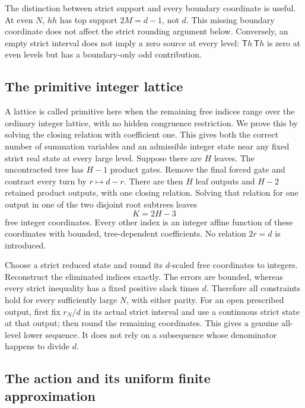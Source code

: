 \documentclass[11pt]{article}
\numberwithin{equation}{section}
\theoremstyle{definition}\newtheorem{definition}[theorem]{Definition}
\theoremstyle{remark}\newtheorem{remark}[theorem]{Remark}
\newcommand{\Turn}{\mathsf T}\newcommand{\Cheb}{\mathsf C}
\begin{document}
The distinction between strict support and every boundary coordinate is useful. At even $N$, $hh$ has top support $2M=d-1$, not $d$. This missing boundary coordinate does not affect the strict rounding argument below. Conversely, an empty strict interval does not imply a zero source at every level: $\Turn h\,\Turn h$ is zero at even levels but has a boundary-only odd contribution.

\subsection{The primitive integer lattice}

A lattice is called primitive here when the remaining free indices range over the ordinary integer lattice, with no hidden congruence restriction. We prove this by solving the closing relation with coefficient one. This gives both the correct number of summation variables and an admissible integer state near any fixed strict real state at every large level.
Suppose there are $H$ leaves. The uncontracted tree has $H-1$ product gates. Remove the final forced gate and contract every turn by $r\mapsto d-r$. There are then $H$ leaf outputs and $H-2$ retained product outputs, with one closing relation. Solving that relation for one output in one of the two disjoint root subtrees leaves
\begin{equation}\label{eq:lattice-dimension}
 K=2H-3
\end{equation}
free integer coordinates. Every other index is an integer affine function of these coordinates with bounded, tree-dependent coefficients. No relation $2r=d$ is introduced.

Choose a strict reduced state and round its $d$-scaled free coordinates to integers. Reconstruct the eliminated indices exactly. The errors are bounded, whereas every strict inequality has a fixed positive slack times $d$. Therefore all constraints hold for every sufficiently large $N$, with either parity. For an open prescribed output, first fix $r_N/d$ in its actual strict interval and use a continuous strict state at that output; then round the remaining coordinates. This gives a genuine all-level lower sequence. It does not rely on a subsequence whose denominator happens to divide $d$.

\subsection{The action and its uniform finite approximation}
\end{document}
